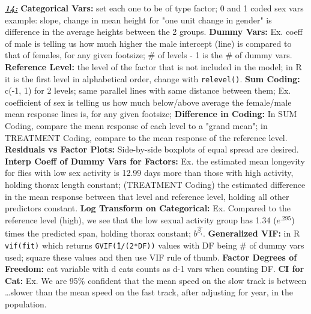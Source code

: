 \documentclass[8pt]{extarticle}
\begin{document}
\textit{\textbf{\underline{14:}}}
\textbf{Categorical Vars:} set each one to be of type factor; 0 and 1 coded 
sex vars example: slope, change in mean height for "one unit change in gender" 
is difference in the average heights between the 2 groups.
\textbf{Dummy Vars:} Ex. coeff of male is telling us how much higher the male 
intercept (line) is compared to that of females, for any given footsize; \# of 
levels - 1 is the \# of dummy vars.
\textbf{Reference Level:} the level of the factor that is not included in the
model; in R it is the first level in alphabetical order, change with 
\texttt{relevel()}.
\textbf{Sum Coding:} c(-1, 1) for 2 levels; same parallel lines with same 
distance between them; Ex. coefficient of sex is telling us how much 
below/above average the female/male mean response lines is, for any given 
footsize; 
\textbf{Difference in Coding:} In SUM Coding, compare the mean response of each 
level to a "grand mean"; in TREATMENT Coding, compare to the mean response of 
the reference level.
\textbf{Residuals vs Factor Plots:} Side-by-side boxplots of equal spread are 
desired.
\textbf{Interp Coeff of Dummy Vars for Factors:} Ex. the estimated mean 
longevity for flies with low sex activity is 12.99 days more than those with 
high activity, holding thorax length constant; (TREATMENT Coding) the estimated 
difference in the mean response between that level and reference level, holding 
all other predictors constant.
\textbf{Log Transform on Categorical:} Ex. Compared to the reference level 
(high), we see that the low sexual activity group has 1.34 ($e^{.295}$) times 
the predicted span, holding thorax constant; $b^{\hat{\beta_i}}$.
\textbf{Generalized VIF:} in R \texttt{vif(fit)} which returns 
\texttt{GVIF\^(1/(2*DF))} values with DF being \# of dummy vars used; square 
these values and then use VIF rule of thumb.
\textbf{Factor Degrees of Freedom:} cat variable with d cats counts as d-1 vars 
when counting DF.
\textbf{CI for Cat:} Ex. We are 95\% confident that the mean speed on the slow 
track is between \dots slower than the mean speed on the fast track, after 
adjusting for year, in the population.\\
\end{document}
